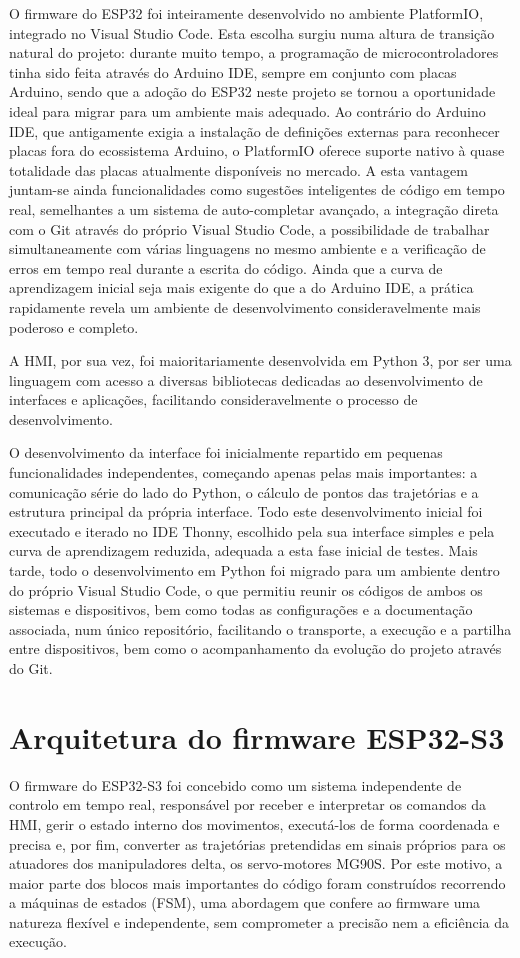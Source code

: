 O firmware do ESP32 foi inteiramente desenvolvido no ambiente PlatformIO, integrado no Visual Studio Code. Esta escolha surgiu numa altura de transição natural do projeto: durante muito tempo, a programação de microcontroladores tinha sido feita através do Arduino IDE, sempre em conjunto com placas Arduino, sendo que a adoção do ESP32 neste projeto se tornou a oportunidade ideal para migrar para um ambiente mais adequado. Ao contrário do Arduino IDE, que antigamente exigia a instalação de definições externas para reconhecer placas fora do ecossistema Arduino, o PlatformIO oferece suporte nativo à quase totalidade das placas atualmente disponíveis no mercado. A esta vantagem juntam-se ainda funcionalidades como sugestões inteligentes de código em tempo real, semelhantes a um sistema de auto-completar avançado, a integração direta com o Git através do próprio Visual Studio Code, a possibilidade de trabalhar simultaneamente com várias linguagens no mesmo ambiente e a verificação de erros em tempo real durante a escrita do código. Ainda que a curva de aprendizagem inicial seja mais exigente do que a do Arduino IDE, a prática rapidamente revela um ambiente de desenvolvimento consideravelmente mais poderoso e completo.

A HMI, por sua vez, foi maioritariamente desenvolvida em Python 3, por ser uma linguagem com acesso a diversas bibliotecas dedicadas ao desenvolvimento de interfaces e aplicações, facilitando consideravelmente o processo de desenvolvimento.

O desenvolvimento da interface foi inicialmente repartido em pequenas funcionalidades independentes, começando apenas pelas mais importantes: a comunicação série do lado do Python, o cálculo de pontos das trajetórias e a estrutura principal da própria interface. Todo este desenvolvimento inicial foi executado e iterado no IDE Thonny, escolhido pela sua interface simples e pela curva de aprendizagem reduzida, adequada a esta fase inicial de testes. Mais tarde, todo o desenvolvimento em Python foi migrado para um ambiente dentro do próprio Visual Studio Code, o que permitiu reunir os códigos de ambos os sistemas e dispositivos, bem como todas as configurações e a documentação associada, num único repositório, facilitando o transporte, a execução e a partilha entre dispositivos, bem como o acompanhamento da evolução do projeto através do Git.

\section{Arquitetura do firmware ESP32-S3}
O firmware do ESP32-S3 foi concebido como um sistema independente de controlo em tempo real, responsável por receber e interpretar os comandos da HMI, gerir o estado interno dos movimentos, executá-los de forma coordenada e precisa e, por fim, converter as trajetórias pretendidas em sinais próprios para os atuadores dos manipuladores delta, os servo-motores MG90S. Por este motivo, a maior parte dos blocos mais importantes do código foram construídos recorrendo a máquinas de estados (FSM), uma abordagem que confere ao firmware uma natureza flexível e independente, sem comprometer a precisão nem a eficiência da execução.


